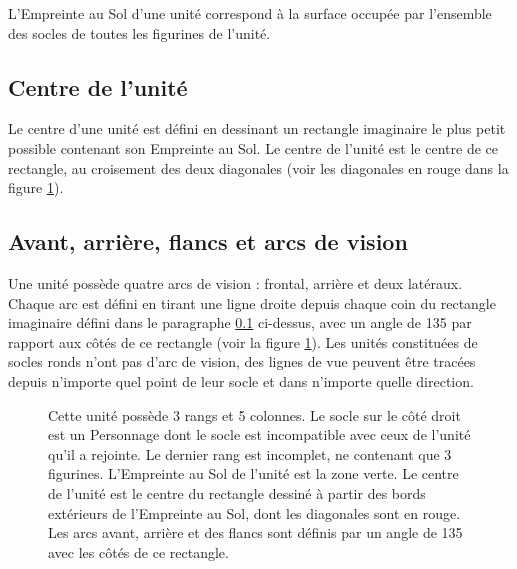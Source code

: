 L'Empreinte au Sol d'une unité correspond à la surface occupée par l'ensemble des socles de toutes les figurines de l'unité.

\subsection{Centre de l'unité}
\label{centre_unite}

Le centre d'une unité est défini en dessinant un rectangle imaginaire le plus petit possible contenant son Empreinte au Sol. Le centre de l'unité est le centre de ce rectangle, au croisement des deux diagonales (voir les diagonales en rouge dans la figure \ref{figure/arcs}).

\subsection{Avant, arrière, flancs et arcs de vision}

Une unité possède quatre arcs de vision : frontal, arrière et deux latéraux. Chaque arc est défini en tirant une ligne droite depuis chaque coin du rectangle imaginaire défini dans le paragraphe \ref{centre_unite} ci-dessus, avec un angle de 135{\text{\degree}} par rapport aux côtés de ce rectangle (voir la figure \ref{figure/arcs}). Les unités constituées de socles ronds n'ont pas d'arc de vision, des lignes de vue peuvent être tracées depuis n'importe quel point de leur socle et dans n'importe quelle direction.

\newcommand{\frontarc}{Arc frontal}
\newcommand{\leftsidearc}{Arc latéral}
\newcommand{\rightsidearc}{Arc latéral}
\newcommand{\reararc}{Arc arrière}
\newcommand{\centreofunit}{\normalfontsize Centre de l'unité}
\newcommand{\firstangle}{90 \text{\degree}}
\newcommand{\secondangle}{135 \text{\degree}}
\begin{figure}[!htbp]
\begin{minipage}[c]{0.65\textwidth}
\def\svgwidth{\textwidth}

\end{minipage}\hfill
\begin{minipage}[c]{0.32\textwidth}
\caption{Cette unité possède 3 rangs et 5 colonnes. Le socle sur le côté droit est un Personnage dont le socle est incompatible avec ceux de l'unité qu'il a rejointe. Le dernier rang est incomplet, ne contenant que 3 figurines. L'Empreinte au Sol de l'unité est la zone verte. Le centre de l'unité est le centre du rectangle dessiné à partir des bords extérieurs de l'Empreinte au Sol, dont les diagonales sont en rouge. Les arcs avant, arrière et des flancs sont définis par un angle de 135{\text{\degree}} avec les côtés de ce rectangle.}
\label{figure/arcs}
\end{minipage}
\end{figure}
